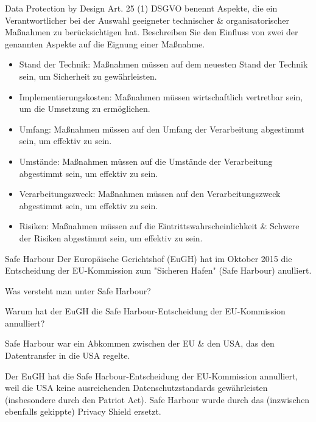 \documentclass{article}
\begin{document}
\begin{exercise}{Data Protection by Design}
  Art. 25 (1) DSGVO benennt Aspekte, die ein Verantwortlicher bei der Auswahl geeigneter technischer \& organisatorischer Maßnahmen zu berücksichtigen hat. Beschreiben Sie den Einfluss von zwei der genannten Aspekte auf die Eignung einer Maßnahme.

  \begin{solution}
    \begin{itemize}
      \item Stand der Technik: Maßnahmen müssen auf dem neuesten Stand der Technik sein, um Sicherheit zu gewährleisten.
      \item Implementierungskosten: Maßnahmen müssen wirtschaftlich vertretbar sein, um die Umsetzung zu ermöglichen.
      \item Umfang: Maßnahmen müssen auf den Umfang der Verarbeitung abgestimmt sein, um effektiv zu sein.
      \item Umstände: Maßnahmen müssen auf die Umstände der Verarbeitung abgestimmt sein, um effektiv zu sein.
      \item Verarbeitungszweck: Maßnahmen müssen auf den Verarbeitungszweck abgestimmt sein, um effektiv zu sein.
      \item Risiken: Maßnahmen müssen auf die Eintrittswahrscheinlichkeit \& Schwere der Risiken abgestimmt sein, um effektiv zu sein.
    \end{itemize}
  \end{solution}
\end{exercise}

\begin{eexercises}{Safe Harbour}{
    Der Europäische Gerichtshof (EuGH) hat im Oktober 2015 die Entscheidung der EU-Kommission zum "Sicheren Hafen" (Safe Harbour) anulliert.
  }
  \item Was versteht man unter Safe Harbour?
  \item Warum hat der EuGH die Safe Harbour-Entscheidung der EU-Kommission annulliert?
\end{eexercises}

\begin{solutions}
  \item Safe Harbour war ein Abkommen zwischen der EU \& den USA, das den Datentransfer in die USA regelte.
  \item Der EuGH hat die Safe Harbour-Entscheidung der EU-Kommission annulliert, weil die USA keine ausreichenden Datenschutzstandards gewährleisten (insbesondere durch den Patriot Act). Safe Harbour wurde durch das (inzwischen ebenfalls gekippte) Privacy Shield ersetzt.
\end{solutions}
\end{document}
